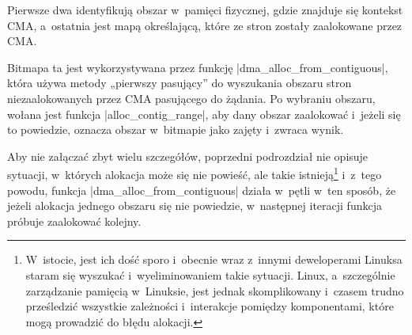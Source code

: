 Pierwsze dwa identyfikują obszar w~pamięci fizycznej, gdzie znajduje
się kontekst CMA, a~ostatnia jest mapą określającą, które ze stron
zostały zaalokowane przez CMA.

Bitmapa ta jest wykorzystywana przez funkcję
\code|dma_alloc_from_contiguous|, która używa metody „pierwszy
pasujący” do wyszukania obszaru stron niezaalokowanych przez CMA
pasującego do żądania.  Po wybraniu obszaru, wołana jest funkcja
\code|alloc_contig_range|, aby dany obszar zaalokować i~jeżeli się to
powiedzie, oznacza obszar w~bitmapie jako zajęty i~zwraca wynik.

Aby nie załączać zbyt wielu szczegółów, poprzedni podrozdział nie
opisuje sytuacji, w~których alokacja może się nie powieść, ale takie
istnieją\footnote{W~istocie, jest ich dość sporo i~obecnie wraz
  z~innymi deweloperami Linuksa staram się wyszukać i~wyeliminowaniem
  takie sytuacji.  Linux, a~szczególnie zarządzanie pamięcią
  w~Linuksie, jest jednak skomplikowany i~czasem trudno prześledzić
  wszystkie zależności i~interakcje pomiędzy komponentami, które mogą
  prowadzić do błędu alokacji.} i~z~tego powodu, funkcja
\code|dma_alloc_from_contiguous| działa w~pętli w~ten sposób, że
jeżeli alokacja jednego obszaru się nie powiedzie, w~następnej
iteracji funkcja próbuje zaalokować kolejny.
